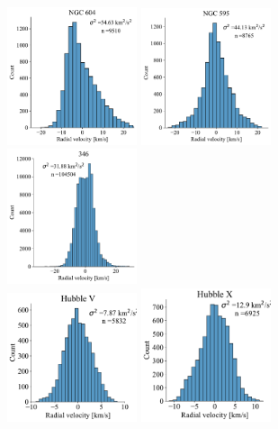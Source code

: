 \documentclass[fleqn,usenatbib, useAMS, a4paper]{mnras}
\begin{document}
\begin{figure}
\centering
\begin{multicols}{3}
\includegraphics[width=1.5in]{Figures/Hist/604}\par
\includegraphics[width=1.5in]{Figures/Hist/595}\par
\includegraphics[width=1.5in]{Figures/Hist/346}\par
\end{multicols}
\begin{multicols}{3}
\includegraphics[width=1.5in]{Figures/Hist/Hubble-V}\par
\includegraphics[width=1.5in]{Figures/Hist/Hubble-X}\par

\end{multicols}
\end{figure}
\end{document}
